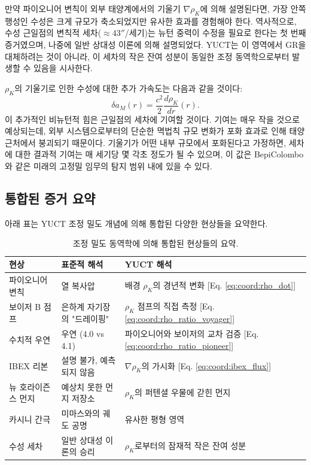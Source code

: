 \documentclass[11pt,a4paper]{article}
\theoremstyle{remark}
\begin{document}
	만약 파이오니어 변칙이 외부 태양계에서의 기울기 $\nabla \rho_K$에 의해 설명된다면, 가장 안쪽 행성인 수성은 크게 규모가 축소되었지만 유사한 효과를 경험해야 한다. 역사적으로, 수성 근일점의 변칙적 세차($\approx 43''$/세기)는 뉴턴 중력이 수정을 필요로 한다는 첫 번째 증거였으며, 나중에 일반 상대성 이론에 의해 설명되었다. YUCT는 이 영역에서 GR을 대체하려는 것이 아니라, 이 세차의 작은 잔여 성분이 동일한 조정 동역학으로부터 발생할 수 있음을 시사한다.
	
	$\rho_K$의 기울기로 인한 수성에 대한 추가 가속도는 다음과 같을 것이다:
	\begin{equation}
		\delta a_M(r) = \frac{c^2}{2} \frac{d\rho_K}{dr}(r).
	\end{equation}
	이 추가적인 비뉴턴적 힘은 근일점의 세차에 기여할 것이다. 기여는 매우 작을 것으로 예상되는데, 외부 시스템으로부터의 단순한 멱법칙 규모 변화가 포화 효과로 인해 태양 근처에서 붕괴되기 때문이다. 기울기가 어떤 내부 규모에서 포화된다고 가정하면, 세차에 대한 결과적 기여는 매 세기당 몇 각초 정도가 될 수 있으며, 이 값은 BepiColombo와 같은 미래의 고정밀 임무의 탐지 범위 내에 있을 수 있다.
	
	\subsection{통합된 증거 요약}
	
	아래 표는 YUCT 조정 밀도 개념에 의해 통합된 다양한 현상들을 요약한다.
	
	\begin{table}[htbp]
		\centering
		\caption{조정 밀도 동역학에 의해 통합된 현상들의 요약.}
		\label{tab:coord:summary}
		\begin{tabular}{|p{4.5cm}|p{4.5cm}|p{5cm}|}
			\hline
			\textbf{현상} & \textbf{표준적 해석} & \textbf{YUCT 해석} \\
			\hline
			파이오니어 변칙 & 열 복사압 & 배경 $\rho_K$의 경년적 변화 [Eq. \ref{eq:coord:rho_dot}] \\
			\hline
			보이저 B 점프 & 은하계 자기장의 "드레이핑" & $\rho_K$ 점프의 직접 측정 [Eq. \ref{eq:coord:rho_ratio_voyager}] \\
			\hline
			수치적 우연 & 우연 (4.0 vs 4.1) & 파이오니어와 보이저의 교차 검증 [Eq. \ref{eq:coord:rho_ratio_pioneer}] \\
			\hline
			IBEX 리본 & 설명 불가, 예측되지 않음 & $\nabla \rho_K$의 가시화 [Eq. \ref{eq:coord:ibex_flux}] \\
			\hline
			뉴 호라이즌스 먼지 & 예상치 못한 먼지 저장소 & $\rho_K$의 퍼텐셜 우물에 갇힌 먼지 \\
			\hline
			카시니 간극 & 미마스와의 궤도 공명 & 유사한 평형 영역 \\
			\hline
			수성 세차 & 일반 상대성 이론의 승리 & $\rho_K$로부터의 잠재적 작은 잔여 성분 \\
			\hline
		\end{tabular}
	\end{table}
	
\end{document}
